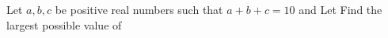 Let $a,b,c$ be positive real numbers such that $a+b+c=10$ and   Let   Find the largest possible value of 